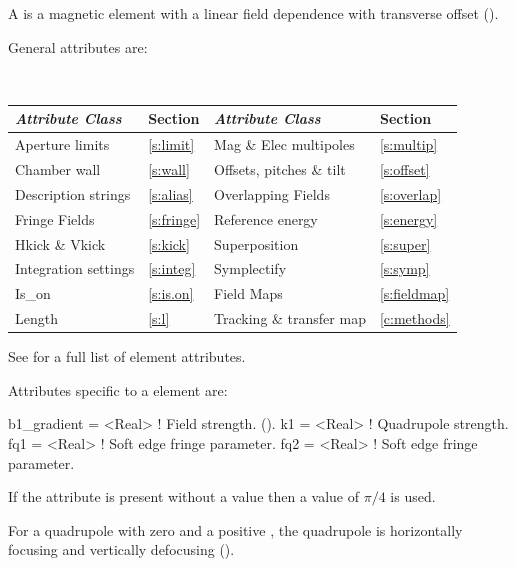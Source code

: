 {A  is a magnetic element with a linear field dependence
with transverse offset ().

General  attributes are:
\begin{center}
\tt
\begin{tabular}{llll} \toprule
  {\sl Attribute Class}      & Section           & {\sl Attribute Class}      & Section            \\ \midrule
  Aperture limits            & \ref{s:limit}     & Mag \& Elec multipoles     & \ref{s:multip}     \\
  Chamber wall               & \ref{s:wall}      & Offsets, pitches \& tilt   & \ref{s:offset}     \\
  Description strings        & \ref{s:alias}     & Overlapping Fields         & \ref{s:overlap}    \\
  Fringe Fields              & \ref{s:fringe}    & Reference energy           & \ref{s:energy}     \\ 
  Hkick \& Vkick             & \ref{s:kick}      & Superposition              & \ref{s:super}      \\
  Integration settings       & \ref{s:integ}     & Symplectify                & \ref{s:symp}       \\
  Is_on                      & \ref{s:is.on}     & Field Maps                 & \ref{s:fieldmap}   \\ 
  Length                     & \ref{s:l}         & Tracking \& transfer map   & \ref{c:methods}    \\ 
  \bottomrule
\end{tabular}
\end{center}
\toffset
See  for a full list of element attributes.

Attributes specific to a  element are:
\begin{example}
  b1_gradient    = <Real>    ! Field strength. ().
  k1             = <Real>    ! Quadrupole strength.
  fq1            = <Real>    ! Soft edge fringe parameter.
  fq2            = <Real>    ! Soft edge fringe parameter.
 \end{example}

If the  attribute is present without a value then a value of $\pi/4$
is used.

For a quadrupole with zero  and a positive , the
quadrupole is horizontally focusing and vertically defocusing
().

}
